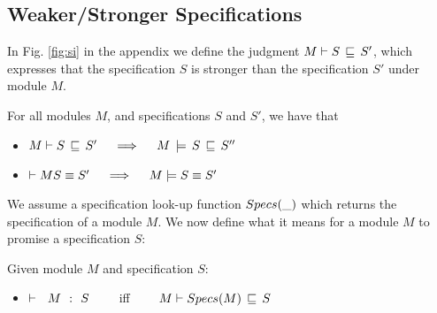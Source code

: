 


\subsection{Weaker/Stronger Specifications}

In   Fig.  \ref{fig:si} in the appendix we define the judgment  $M \vdash S\, \sqsubseteq\, S' $, which expresses that the specification $S$ is stronger than the specification $S'$ under module $M$.  


\begin{lemma}
For all modules $M$, and specifications $S$ and $S'$, we have that
\begin{itemize}
\item
 $\strongerI M  S  {S'}    \ \ \ \ \Longrightarrow\ \ \ \ \stronger M S {S'}'$ 
\item
 $\vdash M S \equiv {S'}    \ \ \ \ \Longrightarrow\ \ \ \ \strongerEq M S {S'}$
\end{itemize}
\end{lemma}


We assume a specification look-up function $Specs(\_)$ which returns the specification of a module $M$.
We now define what it means for a module $M$ to promise a specification $S$:

\begin{definition}
Given module $M$ and specification  $S$: %
\begin{itemize}
\item
${\vdash \ \ M\ \ \mathbf{:}\ \ S}$ \ \ \ \  iff \ \ \ \  ${M \vdash Specs(M)\, \sqsubseteq\, S}$
\end{itemize}
\end{definition}

